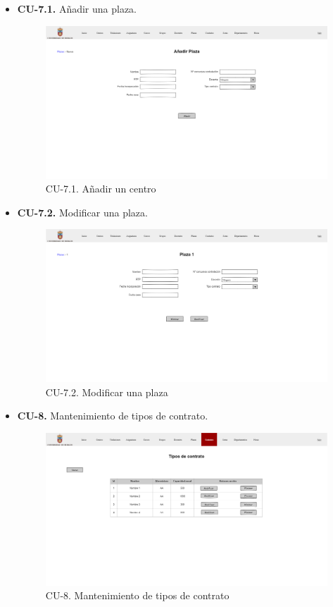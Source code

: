 \begin{itemize}
	\item \textbf{CU-7.1.} Añadir una plaza.
	\begin{figure}[!h]
		\centering
		\includegraphics[width=\textwidth]{../img/Anexos/Vistas/add_plaza.png}
		\caption{CU-7.1. Añadir un centro}\label{fig:../img/Anexos/Vistas/add_plaza.png}
	\end{figure}
	
	\item \textbf{CU-7.2.} Modificar una plaza.
	\begin{figure}[!h]
		\centering
		\includegraphics[width=\textwidth]{../img/Anexos/Vistas/mod_plaza.png}
		\caption{CU-7.2. Modificar una plaza}\label{fig:../img/Anexos/Vistas/mod_plaza.png}
	\end{figure}
	
	\item \textbf{CU-8.} Mantenimiento de tipos de contrato.
	\begin{figure}[!h]
		\centering
		\includegraphics[width=\textwidth]{../img/Anexos/Vistas/contratos.png}
		\caption{CU-8. Mantenimiento de tipos de contrato}\label{fig:../img/Anexos/Vistas/contratos.png}
	\end{figure}
	

\end{itemize}
